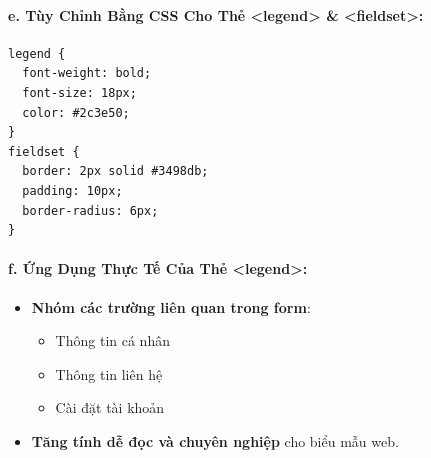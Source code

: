 \paragraph{e. Tùy Chỉnh Bằng CSS Cho Thẻ <legend> \& <fieldset>:}
\begin{codeWindow}
\begin{lstlisting}[language=CSS3]
legend {
  font-weight: bold;
  font-size: 18px;
  color: #2c3e50;
}
fieldset {
  border: 2px solid #3498db;
  padding: 10px;
  border-radius: 6px;
}
\end{lstlisting}
\end{codeWindow}

\paragraph{f. Ứng Dụng Thực Tế Của Thẻ <legend>:}
\begin{itemize}[leftmargin=1.5em, itemsep=3pt, parsep=0pt]
    \item \textbf{Nhóm các trường liên quan trong form}:
    \begin{itemize}[leftmargin=1.2em, itemsep=2pt]
        \item Thông tin cá nhân
        \item Thông tin liên hệ
        \item Cài đặt tài khoản
    \end{itemize}
    \item \textbf{Tăng tính dễ đọc và chuyên nghiệp} cho biểu mẫu web.
\end{itemize}

